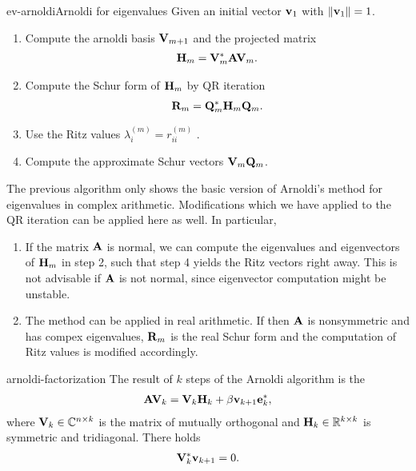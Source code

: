 \begin{Algorithm*}{ev-arnoldi}{Arnoldi for eigenvalues}
  Given an initial vector $\mathbf v_1$ with $\lVert\mathbf v_1\rVert=1$.
  \begin{enumerate}
  \item Compute the arnoldi basis $\mathbf V_{m+1}$ and the projected matrix
    \begin{gather}
      \mathbf H_m = \mathbf V_m^*\mathbf A\mathbf V_m.
    \end{gather}
  \item Compute the Schur form of $\mathbf H_m$ by QR iteration
    \begin{gather}
      \mathbf R_m = \mathbf Q_m^* \mathbf H_m\mathbf Q_m.
    \end{gather}
  \item Use the Ritz values $\lambda_i^{(m)}=r_{ii}^{(m)}$ .
  \item Compute the approximate Schur vectors $\mathbf V_m\mathbf Q_m$.
  \end{enumerate}
\end{Algorithm*}

\begin{remark}
  The previous algorithm only shows the basic version of Arnoldi's
  method for eigenvalues in complex arithmetic. Modifications which we
  have applied to the QR iteration can be applied here as well. In
  particular,
  \begin{enumerate}
  \item If the matrix $\mathbf A$ is normal, we can compute the
    eigenvalues and eigenvectors of $\mathbf H_m$ in step 2, such that
    step 4 yields the Ritz vectors right away. This is not advisable
    if $\mathbf A$ is not normal, since eigenvector computation might be
    unstable.
  \item The method can be applied in real arithmetic. If then $\mathbf A$
    is nonsymmetric and has compex eigenvalues, $\mathbf R_m$ is the real
    Schur form and the computation of Ritz values is modified
    accordingly.
  \end{enumerate}
\end{remark}

\begin{Definition}{arnoldi-factorization}
  The result of $k$ steps of the Arnoldi algorithm is the
  \begin{gather}
    \mathbf A\mathbf V_k = \mathbf V_k\mathbf H_k + \beta\mathbf v_{k+1}\mathbf e_k^*,
  \end{gather}
  where $\mathbf V_k\in\mathbb C^{n\times k}$ is the matrix of mutually
  orthogonal  and $\mathbf H_k\in\mathbb R^{k\times k}$
  is symmetric and tridiagonal. There holds
  \begin{gather}
    \mathbf V_k^*\mathbf v_{k+1} = 0.
  \end{gather}
\end{Definition}

